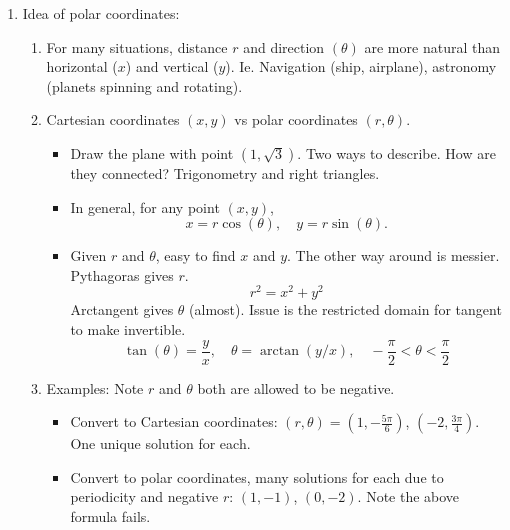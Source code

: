 \documentclass{article}
\begin{document}
\begin{enumerate}
\item Idea of polar coordinates:  
\begin{enumerate}
\item For many situations, distance $r$ and direction $(\theta)$ are more natural than horizontal ($x$) and vertical ($y$). Ie. Navigation (ship, airplane), astronomy (planets spinning and rotating). 
\item Cartesian coordinates $(x,y)$ vs polar coordinates $(r,\theta)$. 
\begin{itemize}
\item Draw the plane with point $(1,\sqrt{3})$. Two ways to describe. How are they connected? Trigonometry and right triangles. 
\item In general, for any point $(x,y)$, 
\[
x = r\cos(\theta), \quad y=r\sin(\theta).
\]
\item Given $r$ and $\theta$, easy to find $x$ and $y$. The other way around is messier. Pythagoras gives $r$.
\[
r^2 = x^2 + y^2
\]
Arctangent gives $\theta$ (almost). Issue is the restricted domain for tangent to make invertible.
\[
\tan(\theta) = \frac{y}{x}, \quad \theta = \arctan(y/x), \quad -\frac{\pi}{2} < \theta < \frac{\pi}{2}
\]
\end{itemize}
\item Examples: Note $r$ and $\theta$ both are allowed to be negative.
\begin{itemize}
\item Convert to Cartesian coordinates: $(r,\theta) = (1,-\frac{5\pi}{6})$, $(-2,\frac{3\pi}{4})$. One unique solution for each.
\item Convert to polar coordinates, many solutions for each due to periodicity and negative $r$: $(1,-1)$, $(0,-2)$. Note the above formula fails.
\end{itemize}
\end{enumerate}


\end{enumerate}
\end{document}
